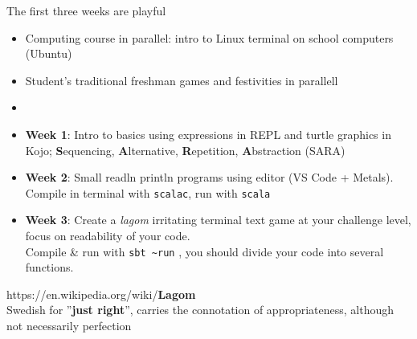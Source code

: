 \documentclass[aspectratio=169]{beamer}
\newcommand{\code}{\lstinline[basicstyle=\ttfamily]}
\newenvironment{Slide}[1]%
  {\begin{frame}[environment=Slide]{#1}}
  {\end{frame}}%
\begin{document}
\begin{Slide}{The first three weeks are playful}
  
  \begin{itemize}
    \item Computing course in parallel: intro to Linux terminal on school computers (Ubuntu)
    \item Student's traditional freshman games and festivities in parallell
    \item []
    \item \textbf{Week 1}: Intro to basics using expressions in REPL and turtle graphics in Kojo; \textbf{S}equencing, \textbf{A}lternative, \textbf{R}epetition, \textbf{A}bstraction (SARA)%
    \begin{minipage}{0.3\textwidth}
      
    \end{minipage} 
 
    \item \textbf{Week 2}: Small readln println programs using editor (VS Code + Metals).\\ Compile in terminal with \code|scalac|, run with \code|scala|
      
    \item \textbf{Week 3}: Create a \textit{lagom} irritating terminal text game at your challenge level, focus on readability of your code.\\ 
      
      Compile \& run with \code|sbt ~run| , you should divide your code into several functions.   
  \end{itemize}
\footnotesize{https://en.wikipedia.org/wiki/\textbf{Lagom} \\ Swedish for ''\textbf{just right}'', carries the connotation of appropriateness, although not necessarily perfection}
\end{Slide}  
\end{document}
